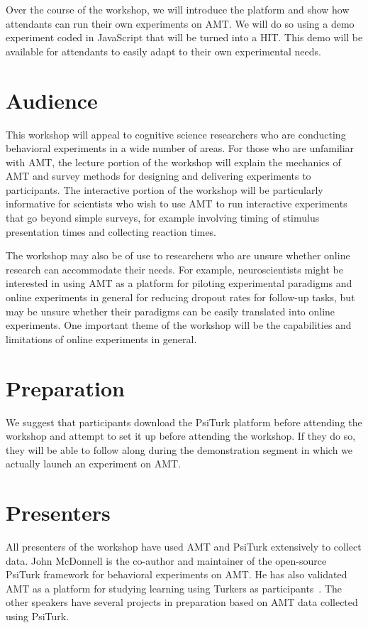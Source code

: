\documentclass[10pt,letterpaper]{article}
\begin{document}
Over the course of the workshop, we will introduce the platform and show how
attendants can run their own experiments on {AMT}. We will do so using a demo
experiment coded in JavaScript that will be turned into a {HIT}. This demo will
be available for attendants to easily adapt to their own experimental needs.

\section{Audience}
This workshop will appeal to cognitive science researchers who are conducting
behavioral experiments in a wide number of areas. For those who are unfamiliar
with AMT, the lecture portion of the workshop will explain the mechanics of AMT
and survey methods for designing and delivering experiments to participants.  The
interactive portion of the workshop will be particularly informative for
scientists who wish to use AMT to run interactive experiments that go beyond
simple surveys, for example involving timing of stimulus presentation times and
collecting reaction times.

The workshop may also be of use to researchers who are unsure whether online
research can accommodate their needs. For example, neuroscientists might be
interested in using AMT as a platform for piloting experimental paradigms and
online experiments in general for reducing dropout rates for follow-up tasks, but
may be unsure whether their paradigms can be easily translated into online
experiments. One important theme of the workshop will be the capabilities and
limitations of online experiments in general.

\section{Preparation}
We suggest that participants download the PsiTurk platform before attending the
workshop and attempt to set it up before attending the workshop. If they do so,
they will be able to follow along during the demonstration segment in which we
actually launch an experiment on AMT.

\section{Presenters}
All presenters of the workshop have used AMT and PsiTurk extensively to collect
data. John McDonnell is the co-author and maintainer of the open-source PsiTurk
framework for behavioral experiments on {AMT}. He has also validated AMT as a
platform for studying learning using Turkers as
participants~\cite{crump2013evaluating}. The other speakers have several projects
in preparation based on AMT data collected using PsiTurk. 




\setlength{\bibleftmargin}{.125in}
\setlength{\bibindent}{-\bibleftmargin}



\todos
\end{document}
